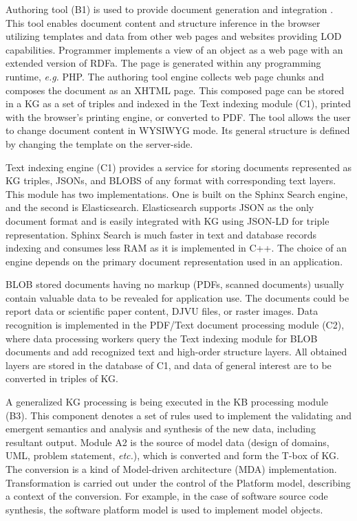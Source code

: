 \documentclass[
]{ceurart}
\begin{document}
Authoring tool (B1) is used to provide document generation and integration \cite{sibiricon}. This tool enables document content and structure inference in the browser utilizing templates and data from other web pages and websites providing LOD capabilities. Programmer implements a view of an object as a web page with an extended version of RDFa. The page is generated within any programming runtime, \emph{e.g.} PHP. The authoring tool engine collects web page chunks and composes the document as an XHTML page. This composed page can be stored in a KG as a set of triples and indexed in the Text indexing module (C1), printed with the browser's printing engine, or converted to PDF. The tool allows the user to change document content in WYSIWYG mode. Its general structure is defined by changing the template on the server-side.

Text indexing engine (C1) provides a service for storing documents represented as KG triples, JSONs, and BLOBS of any format with corresponding text layers. This module has two implementations. One is built on the Sphinx Search engine, and the second is Elasticsearch.  Elasticsearch supports JSON as the only document format and is easily integrated with KG using JSON-LD for triple representation. Sphinx Search is much faster in text and database records indexing and consumes less RAM as it is implemented in C++. The choice of an engine depends on the primary document representation used in an application.

BLOB stored documents having no markup (PDFs, scanned documents) usually contain valuable data to be revealed for application use. The documents could be report data or scientific paper content, DJVU files, or raster images. Data recognition is implemented in the PDF/Text document processing module (C2), where data processing workers query the Text indexing module for BLOB documents and add recognized text and high-order structure layers. All obtained layers are stored in the database of C1, and data of general interest are to be converted in triples of KG.

A generalized KG processing is being executed in the KB processing module (B3). This component denotes a set of rules used to implement the validating and emergent semantics and analysis and synthesis of the new data, including resultant output. Module A2 is the source of model data (design of domains, UML, problem statement, \emph{etc.}), which is converted and form the T-box of KG. The conversion is a kind of Model-driven architecture (MDA) implementation. Transformation is carried out under the control of the Platform model, describing a context of the conversion. For example, in the case of software source code synthesis, the software platform model is used to implement model objects.
\end{document}
